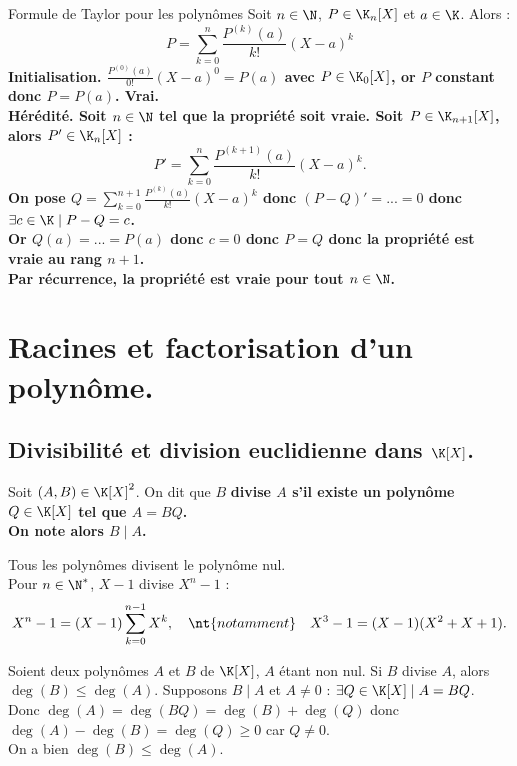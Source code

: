 \documentclass[11pt]{article}
\begin{document}
\begin{prop}{Formule de Taylor pour les polynômes}{}
    Soit $n\in\N$, $P\in\K_n[X]$ et $a\in\K$. Alors :
    \begin{equation*}
        P=\sum_{k=0}^n\frac{P^{(k)}(a)}{k!}(X-a)^k
    \end{equation*}
    \tcblower
    \bf{Initialisation.} $\frac{P^{(0)}(a)}{0!}(X-a)^0=P(a)$ avec $P\in\K_0[X]$, or $P$ constant donc $P=P(a)$. Vrai.\\
    \bf{Hérédité.} Soit $n\in\N$ tel que la propriété soit vraie. Soit $P\in\K_{n+1}[X]$, alors $P'\in\K_n[X]$ :
    \begin{equation*}
        P'=\sum_{k=0}^n\frac{P^{(k+1)}(a)}{k!}(X-a)^k.
    \end{equation*}
    On pose $Q=\sum_{k=0}^{n+1}\frac{P^{(k)}(a)}{k!}(X-a)^k$ donc $(P-Q)'=...=0$ donc $\exists c\in\K\mid P-Q=c$.\\
    Or $Q(a)=...=P(a)$ donc $c=0$ donc $P=Q$ donc la propriété est vraie au rang $n+1$.\\
    Par récurrence, la propriété est vraie pour tout $n\in\N$.
\end{prop}

\section{Racines et factorisation d'un polynôme.}

\subsection{Divisibilité et division euclidienne dans \texorpdfstring{$\K[X]$}{Lg}.}

\begin{defi}{}{}
    Soit $(A,B)\in\K[X]^2$. On dit que $B$ \bf{divise} $A$ s'il existe un polynôme $Q\in\K[X]$ tel que $A=BQ$.\\
    On note alors $B\mid A$.
\end{defi}

\begin{ex}{}{}
    Tous les polynômes divisent le polynôme nul.\\
    Pour $n\in\N^*$, $X-1$ divise $X^n-1$ :
    \begin{equation*}
        X^n - 1 = (X-1)\sum_{k=0}^{n-1}X^k, \quad \nt{notamment} \quad X^3-1=(X-1)(X^2+X+1).
    \end{equation*}
\end{ex}

\begin{prop}{}{}
    Soient deux polynômes $A$ et $B$ de $\K[X]$, $A$ étant non nul. Si $B$ divise $A$, alors $\deg(B)\leq\deg(A)$.
    \tcblower
    Supposons $B\mid A$ et $A\neq0$ : $\exists Q \in \K[X]\mid A=BQ$.\\
    Donc $\deg(A)=\deg(BQ)=\deg(B)+\deg(Q)$ donc $\deg(A)-\deg(B)=\deg(Q)\geq0$ car $Q\neq0$.\\
    On a bien $\deg(B)\leq\deg(A)$.
\end{prop}
\end{document}
